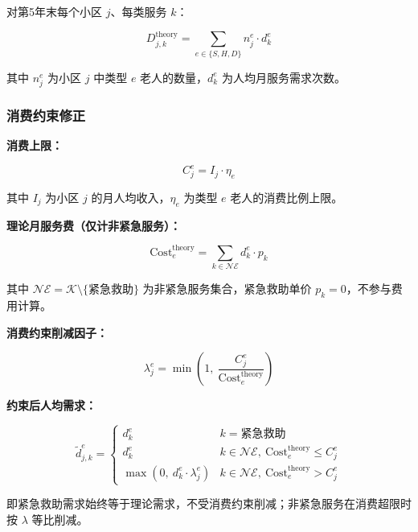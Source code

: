 \documentclass[UTF8]{ctexart}
\begin{document}
对第5年末每个小区 $j$、每类服务 $k$：

\begin{equation}
D_{j,k}^{\text{theory}} = \sum_{e\in\{S,H,D\}} n_{j}^{e} \cdot d_k^{e} \tag{1.4}
\end{equation}

其中 $n_j^e$ 为小区 $j$ 中类型 $e$ 老人的数量，$d_k^e$ 为人均月服务需求次数。

\subsubsection{消费约束修正}

\textbf{消费上限：}

\begin{equation}
C_{j}^{e} = I_j \cdot \eta_e \tag{1.5}
\end{equation}

其中 $I_j$ 为小区 $j$ 的月人均收入，$\eta_e$ 为类型 $e$ 老人的消费比例上限。

\textbf{理论月服务费（仅计非紧急服务）：}

\begin{equation}
\text{Cost}_e^{\text{theory}} = \sum_{k\in\mathcal{NE}} d_k^{e} \cdot p_k \tag{1.6}
\end{equation}

其中 $\mathcal{NE}=\mathcal{K}\setminus\{\text{紧急救助}\}$ 为非紧急服务集合，紧急救助单价 $p_k=0$，不参与费用计算。

\textbf{消费约束削减因子：}

\begin{equation}
\lambda_{j}^{e} = \min\left(1,\ \frac{C_{j}^{e}}{\text{Cost}_e^{\text{theory}}}\right) \tag{1.7}
\end{equation}

\textbf{约束后人均需求：}

\begin{equation}
\tilde{d}_{j,k}^{e} = \begin{cases} d_k^{e} & k=\text{紧急救助} \\[4pt] d_k^{e} & k\in\mathcal{NE},\ \text{Cost}_e^{\text{theory}} \leq C_j^{e} \\[4pt] \max(0,\ d_k^{e} \cdot \lambda_j^{e}) & k\in\mathcal{NE},\ \text{Cost}_e^{\text{theory}} > C_j^{e} \end{cases} \tag{1.8}
\end{equation}

即紧急救助需求始终等于理论需求，不受消费约束削减；非紧急服务在消费超限时按 $\lambda$ 等比削减。
\end{document}
